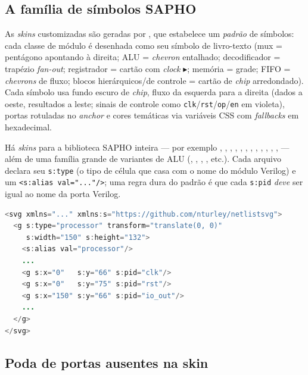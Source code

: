 \subsection{A família de símbolos SAPHO}

As \emph{skins} customizadas são geradas por
, que estabelece um \emph{padrão} de
símbolos: cada classe de módulo é desenhada como seu símbolo de livro-texto (mux
= pentágono apontando à direita; ALU = \emph{chevron} entalhado; decodificador =
trapézio \emph{fan-out}; registrador = cartão com \emph{clock} $\blacktriangleright$;
memória = grade; FIFO = \emph{chevrons} de fluxo; blocos hierárquicos/de controle
= cartão de \emph{chip} arredondado). Cada símbolo usa fundo escuro de \emph{chip},
fluxo da esquerda para a direita (dados a oeste, resultados a leste; sinais de
controle como \lstinline|clk|/\lstinline|rst|/\lstinline|op|/\lstinline|en| em
violeta), portas rotuladas no \emph{anchor} e cores temáticas via variáveis CSS
com \emph{fallbacks} em hexadecimal.

Há \emph{skins} para a biblioteca SAPHO inteira --- por exemplo
, , , ,
, , ,
, , , ,
,  --- além de uma família grande de variantes
de ALU (, , ,
,  etc.). Cada arquivo declara seu
\lstinline|s:type| (o tipo de célula que casa com o nome do módulo Verilog) e um
\lstinline|<s:alias val="..."/>|; uma regra dura do padrão é que cada
\lstinline|s:pid| \emph{deve} ser igual ao nome da porta Verilog.

\begin{lstlisting}[language=Java,caption={Cabeçalho de uma skin SAPHO (assets/prism-skins/processor.svg)}]
<svg xmlns="..." xmlns:s="https://github.com/nturley/netlistsvg">
  <g s:type="processor" transform="translate(0, 0)"
     s:width="150" s:height="132">
    <s:alias val="processor"/>
    ...
    <g s:x="0"   s:y="66" s:pid="clk"/>
    <g s:x="0"   s:y="75" s:pid="rst"/>
    <g s:x="150" s:y="66" s:pid="io_out"/>
    ...
  </g>
</svg>
\end{lstlisting}

\subsection{Poda de portas ausentes na skin}
\label{sec:skin-ports}

